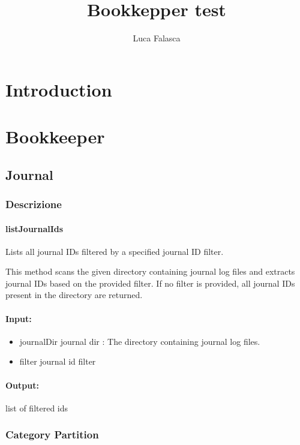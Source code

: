 \documentclass[12pt, a4paper]{article}
\title{Bookkepper test}
\author{Luca Falasca}
\begin{document}
\maketitle
\tableofcontents

\listoffigures
\listoftables

\newpage

\section{Introduction}

\section{Bookkeeper}
\subsection{Journal}
\subsubsection{Descrizione}
\paragraph{listJournalIds}
Lists all journal IDs filtered by a specified journal ID filter.

This method scans the given directory containing journal log files and extracts
journal IDs based on the provided filter. If no filter is provided, all journal
IDs present in the directory are returned.


\paragraph{Input:}
\begin{itemize}
  \item journalDir journal dir : The directory containing journal log files.
  \item filter journal id filter
\end{itemize}
\paragraph{Output:}
    list of filtered ids

\subsubsection{Category Partition}
\end{document}
